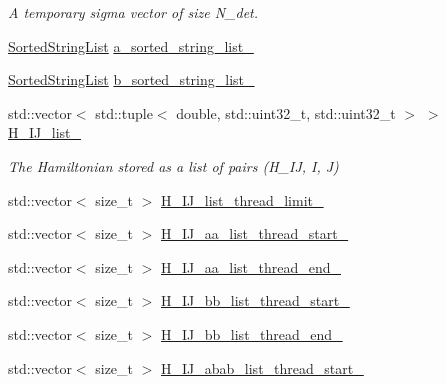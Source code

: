 \begin{DoxyCompactItemize}
\begin{DoxyCompactList}\small\item\em A temporary sigma vector of size N\+\_\+det. \end{DoxyCompactList}\item 
\mbox{\hyperlink{classforte_1_1_sorted_string_list}{Sorted\+String\+List}} \mbox{\hyperlink{classforte_1_1_sigma_vector_dynamic_ad73df6a42410729e4c4af3a4b02b6c77}{a\+\_\+sorted\+\_\+string\+\_\+list\+\_\+}}
\item 
\mbox{\hyperlink{classforte_1_1_sorted_string_list}{Sorted\+String\+List}} \mbox{\hyperlink{classforte_1_1_sigma_vector_dynamic_adce1ba2ba0017146310352eb68b8189b}{b\+\_\+sorted\+\_\+string\+\_\+list\+\_\+}}
\item 
std\+::vector$<$ std\+::tuple$<$ double, std\+::uint32\+\_\+t, std\+::uint32\+\_\+t $>$ $>$ \mbox{\hyperlink{classforte_1_1_sigma_vector_dynamic_aa8f1f16414182bc4c82ac6371e030c30}{H\+\_\+\+I\+J\+\_\+list\+\_\+}}
\begin{DoxyCompactList}\small\item\em The Hamiltonian stored as a list of pairs (H\+\_\+\+IJ, I, J) \end{DoxyCompactList}\item 
std\+::vector$<$ size\+\_\+t $>$ \mbox{\hyperlink{classforte_1_1_sigma_vector_dynamic_a0789df9ec4056b3be2cda9ba805a2af6}{H\+\_\+\+I\+J\+\_\+list\+\_\+thread\+\_\+limit\+\_\+}}
\item 
std\+::vector$<$ size\+\_\+t $>$ \mbox{\hyperlink{classforte_1_1_sigma_vector_dynamic_a17aaacecd5da481ba8424aa20c95cca2}{H\+\_\+\+I\+J\+\_\+aa\+\_\+list\+\_\+thread\+\_\+start\+\_\+}}
\item 
std\+::vector$<$ size\+\_\+t $>$ \mbox{\hyperlink{classforte_1_1_sigma_vector_dynamic_a025fd0facb65e035947d7be6adb7df4c}{H\+\_\+\+I\+J\+\_\+aa\+\_\+list\+\_\+thread\+\_\+end\+\_\+}}
\item 
std\+::vector$<$ size\+\_\+t $>$ \mbox{\hyperlink{classforte_1_1_sigma_vector_dynamic_a9704c268df8651ca5af5185853936c49}{H\+\_\+\+I\+J\+\_\+bb\+\_\+list\+\_\+thread\+\_\+start\+\_\+}}
\item 
std\+::vector$<$ size\+\_\+t $>$ \mbox{\hyperlink{classforte_1_1_sigma_vector_dynamic_a5354d1805bbf0dad643e4dc1157a44cf}{H\+\_\+\+I\+J\+\_\+bb\+\_\+list\+\_\+thread\+\_\+end\+\_\+}}
\item 
std\+::vector$<$ size\+\_\+t $>$ \mbox{\hyperlink{classforte_1_1_sigma_vector_dynamic_ac9da1448d14c5f185d3730e46fa82432}{H\+\_\+\+I\+J\+\_\+abab\+\_\+list\+\_\+thread\+\_\+start\+\_\+}}

\end{DoxyCompactItemize}
